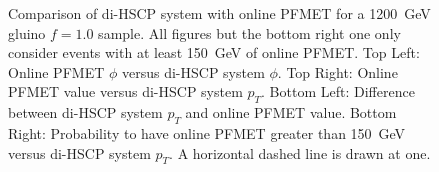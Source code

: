 \begin{figure}
\begin{center}
      \caption[Comparison of di-HSCP system $\phi$ and \pt\ with online PFMET for a 1200~GeV 
gluino $f=1.0$ sample in events with at least 150~GeV of online PFMET.]
        {Comparison of di-HSCP system with online PFMET for a 1200~GeV gluino $f=1.0$ sample. All figures but the bottom right one only consider 
	  events with at least 150~GeV of online PFMET. 
         Top Left: Online PFMET $\phi$ versus di-HSCP system $\phi.$ Top Right: Online PFMET value versus di-HSCP system $p_T$. 
         Bottom Left: Difference between di-HSCP system $p_T$ and online PFMET value.
         Bottom Right: Probability to have online PFMET greater than 150~GeV versus di-HSCP system $p_T$. A horizontal dashed line is drawn at one.
        }
      \label{fig:SystPtTrigger}
  \end{center}
\end{figure}

